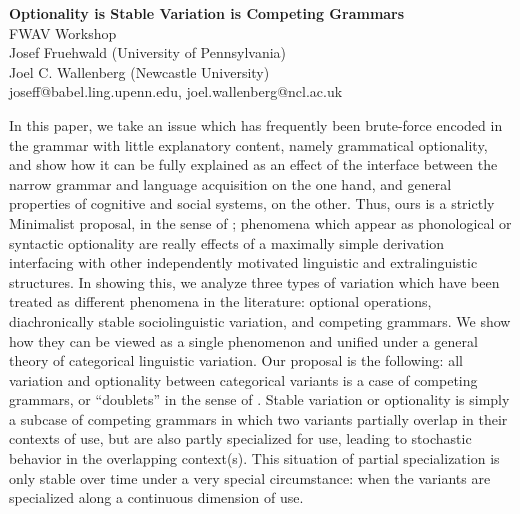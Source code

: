 \documentclass[a4paper,aps,prl,12pt,tightenlines,superscriptaddress]{revtex4}
\title{}%
\begin{document}
\begin{center} \textbf{Optionality is Stable Variation is Competing Grammars}  \\FWAV Workshop \\ Josef Fruehwald (University of Pennsylvania) \\ Joel C. Wallenberg (Newcastle University) \\ joseff@babel.ling.upenn.edu, joel.wallenberg@ncl.ac.uk \end{center}


\noindent In this paper, we take an issue which has frequently been brute-force encoded in the grammar with little explanatory content, namely grammatical optionality, and show how it can be fully explained as an effect of the interface between the narrow grammar and language acquisition on the one hand, and general properties of cognitive and social systems, on the other.
Thus, ours is a strictly Minimalist proposal, in the sense of \citet[][and subsequent]{chomsky1993, chomsky2001}; phenomena which appear as phonological or syntactic optionality are really effects of a maximally simple derivation interfacing with other independently motivated linguistic and extralinguistic structures. In showing this, we analyze three types of variation which have been treated as different phenomena in the literature: optional operations, diachronically stable sociolinguistic variation, and competing grammars. We show how they can be viewed as a single phenomenon and unified under a general theory of categorical linguistic variation. 
Our proposal is the following: all variation and optionality between categorical variants is a case of competing grammars, or ``doublets'' in the sense of \citet{kroch1994}. 
Stable variation or optionality is simply a subcase of competing grammars in which two variants partially overlap in their contexts of use, but are also partly specialized for use, leading to stochastic behavior in the overlapping context(s). 
This situation of partial specialization is only stable over time under a very special circumstance: when the variants are specialized along a continuous dimension of use.%
\end{document}
